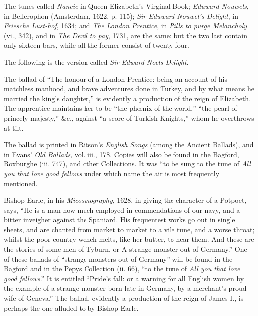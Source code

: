 
The tunes called \textit{Nancie} in Queen Elizabeth’s Virginal Book; \textit{Eduward
Nouwels}, in Bellerophon (Amsterdam, 1622, p. 115); \textit{Sir Eduward Nouwel’s
Delight}, in \textit{Friesche Lust-hof}, 1634; and \textit{The London Prentice}, in \textit{Pills to purge
Melancholy} (vi., 342), and in \textit{The Devil to pay}, 1731, are the same: but the two
last contain only sixteen bars, while all the former consist of twenty-four.

The following is the version called \textit{Sir Edward Noels Delight}.

\medskip
{}


The ballad of “The honour of a London Prentice: being an account of his
matchless manhood, and brave adventures done in Turkey, and by what means he
married the king’s daughter,” is evidently a production of the reign of Elizabeth.
The apprentice maintains her to be “the phœnix of the world,” “the pearl of
princely majesty,” \&c., against “a score of Turkish Knights,” whom he overthrows
at tilt.

The ballad is printed in Ritson’s \textit{English Songs} (among the Ancient Ballads),
and in Evans’ \textit{Old Ballads}, vol. iii., 178. Copies will also be found in the Bagford,
Roxburghe (iii. 747), and other Collections. It was “to be sung to the tune
of \textit{All you that love good fellows} under which name the air is most frequently
mentioned.
\pagebreak


Bishop Earle, in his \textit{Micosmography}, 1628, in giving the character of a Potpoet,
says, “He is a man now much employed in commendations of our navy, and
a bitter inveigher against the Spaniard. His frequentest works go out in single
sheets, and are chanted from market to market to a vile tune, and a worse throat;
whilst the poor country wench melts, like her butter, to hear them. And these
are the stories of some men of Tyburn, or A strange monster out of Germany.”
One of these ballads of “strange monsters out of Germany” will be found in the
Bagford and in the Pepys Collection (ii. 66), “to the tune of \textit{All you that love
good fellows}.” It is entitled “Pride’s fall: or a warning for all English women
by the example of a strange monster born late in Germany, by a merchant’s
proud wife of Geneva.” The ballad, evidently a production of the reign of
James I., is perhaps the one alluded to by Bishop Earle.

